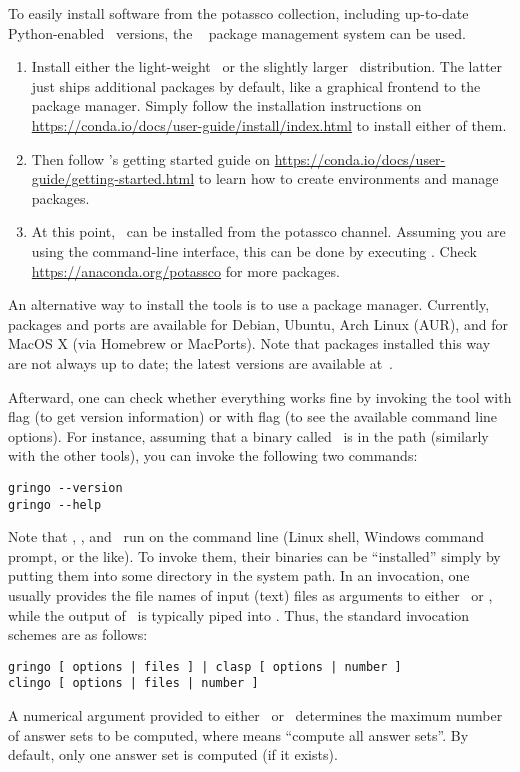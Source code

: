 To easily install software from the potassco collection, including up-to-date Python-enabled \clingo\ versions,
the \conda~\cite{conda} package management system can be used.
\begin{enumerate}
\item
Install either the light-weight \miniconda\ or the slightly larger \anaconda\ distribution.
The latter just ships additional packages by default, like a graphical frontend to the package manager.
Simply follow the installation instructions on \url{https://conda.io/docs/user-guide/install/index.html} to install either of them.
\item
Then follow \conda's getting started guide on \url{https://conda.io/docs/user-guide/getting-started.html} to learn how to create environments and manage packages.
\item
At this point, \clingo\ can be installed from the potassco channel.
Assuming you are using the command-line interface, this can be done by executing
.
Check \url{https://anaconda.org/potassco} for more packages.
\end{enumerate}

An alternative way to install the tools is to use a package manager.
Currently, packages and ports are available for Debian, Ubuntu, Arch Linux (AUR), and for MacOS X (via Homebrew or MacPorts).
Note that packages installed this way are not always up to date;
the latest versions are available at~\cite{potassco}.

Afterward,
one can check whether every\-thing works fine by invoking the tool
with flag  (to get version information) or
with flag  (to see the available command line options).
For instance, assuming that a binary called \gringo\ is in the path
(similarly with the other tools),
you can invoke the following two commands:
%
\begin{lstlisting}[numbers=none]
gringo --version
gringo --help
\end{lstlisting}

Note that \gringo, \clasp, and \clingo\
run on the command line (Linux shell, Windows command prompt, or the like).
To invoke them, their binaries can be ``installed''
simply by putting them into some directory in the system path.
In an invocation,
one usually provides the file names of input (text) files
as arguments to either \gringo\ or \clingo,
while the output of \gringo\ is typically piped into \clasp.
Thus, the standard invocation schemes are as follows:
\begin{lstlisting}[numbers=none]
gringo [ options | files ] | clasp [ options | number ]
clingo [ options | files | number ]
\end{lstlisting}
A numerical argument provided to either \clasp\ or \clingo\
determines the maximum number of answer sets to be computed,
where \code{0} means ``compute all answer sets''.
By default, only one answer set is computed (if it exists).

